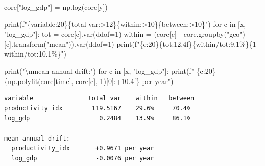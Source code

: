 \documentclass[
  letterpaper,
  10pt,
  twoside,
  openright,
  numbers=noenddot,
  chapterprefix=true]{scrbook}
\newenvironment{Shaded}{}{}
\newcommand{\BuiltInTok}[1]{\textcolor[rgb]{0.84,0.23,0.29}{#1}}
\newcommand{\CharTok}[1]{\textcolor[rgb]{0.01,0.18,0.38}{#1}}
\newcommand{\ControlFlowTok}[1]{\textcolor[rgb]{0.84,0.23,0.29}{#1}}
\newcommand{\DecValTok}[1]{\textcolor[rgb]{0.00,0.36,0.77}{#1}}
\newcommand{\KeywordTok}[1]{\textcolor[rgb]{0.84,0.23,0.29}{#1}}
\newcommand{\NormalTok}[1]{\textcolor[rgb]{0.14,0.16,0.18}{#1}}
\newcommand{\OperatorTok}[1]{\textcolor[rgb]{0.14,0.16,0.18}{#1}}
\newcommand{\SpecialCharTok}[1]{\textcolor[rgb]{0.00,0.36,0.77}{#1}}
\newcommand{\SpecialStringTok}[1]{\textcolor[rgb]{0.01,0.18,0.38}{#1}}
\newcommand{\StringTok}[1]{\textcolor[rgb]{0.01,0.18,0.38}{#1}}
\begin{document}
\label{check-decomposition}
\begin{Shaded}
\begin{Highlighting}[]
\NormalTok{core[}\StringTok{"log\_gdp"}\NormalTok{] }\OperatorTok{=}\NormalTok{ np.log(core[y])}

\BuiltInTok{print}\NormalTok{(}\SpecialStringTok{f"}\SpecialCharTok{\{}\StringTok{\textquotesingle{}variable\textquotesingle{}}\SpecialCharTok{:20\}\{}\StringTok{\textquotesingle{}total var\textquotesingle{}}\SpecialCharTok{:\textgreater{}12\}\{}\StringTok{\textquotesingle{}within\textquotesingle{}}\SpecialCharTok{:\textgreater{}10\}\{}\StringTok{\textquotesingle{}between\textquotesingle{}}\SpecialCharTok{:\textgreater{}10\}}\SpecialStringTok{"}\NormalTok{)}
\ControlFlowTok{for}\NormalTok{ c }\KeywordTok{in}\NormalTok{ [x, }\StringTok{"log\_gdp"}\NormalTok{]:}
\NormalTok{    tot }\OperatorTok{=}\NormalTok{ core[c].var(ddof}\OperatorTok{=}\DecValTok{1}\NormalTok{)}
\NormalTok{    within }\OperatorTok{=}\NormalTok{ (core[c] }\OperatorTok{{-}}\NormalTok{ core.groupby(}\StringTok{"geo"}\NormalTok{)[c].transform(}\StringTok{"mean"}\NormalTok{)).var(ddof}\OperatorTok{=}\DecValTok{1}\NormalTok{)}
    \BuiltInTok{print}\NormalTok{(}\SpecialStringTok{f"}\SpecialCharTok{\{}\NormalTok{c}\SpecialCharTok{:20\}\{}\NormalTok{tot}\SpecialCharTok{:12.4f\}\{}\NormalTok{within}\OperatorTok{/}\NormalTok{tot}\SpecialCharTok{:9.1\%\}\{}\DecValTok{1} \OperatorTok{{-}}\NormalTok{ within}\OperatorTok{/}\NormalTok{tot}\SpecialCharTok{:10.1\%\}}\SpecialStringTok{"}\NormalTok{)}

\BuiltInTok{print}\NormalTok{(}\StringTok{"}\CharTok{\textbackslash{}n}\StringTok{mean annual drift:"}\NormalTok{)}
\ControlFlowTok{for}\NormalTok{ c }\KeywordTok{in}\NormalTok{ [x, }\StringTok{"log\_gdp"}\NormalTok{]:}
    \BuiltInTok{print}\NormalTok{(}\SpecialStringTok{f"  }\SpecialCharTok{\{}\NormalTok{c}\SpecialCharTok{:20\}\{}\NormalTok{np}\SpecialCharTok{.}\NormalTok{polyfit(core[}\StringTok{\textquotesingle{}time\textquotesingle{}}\NormalTok{], core[c], }\DecValTok{1}\NormalTok{)[}\DecValTok{0}\NormalTok{]}\SpecialCharTok{:+10.4f\}}\SpecialStringTok{ per year"}\NormalTok{)}
\end{Highlighting}
\end{Shaded}

\begin{verbatim}
variable               total var    within   between
productivity_idx        119.5167    29.6%     70.4%
log_gdp                   0.2484    13.9%     86.1%

mean annual drift:
  productivity_idx       +0.9671 per year
  log_gdp                -0.0076 per year
\end{verbatim}
\end{document}

